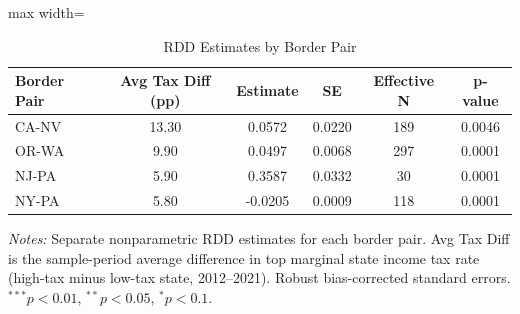 \begin{table}[htbp]
\centering
\caption{RDD Estimates by Border Pair}
\label{tab:pair_het}
\begin{adjustbox}{max width=\textwidth}
\begin{tabular}{lccccc}
  \hline
Border Pair & Avg Tax Diff (pp) & Estimate & SE & Effective N & p-value \\ 
  \hline
CA-NV & 13.30 &  0.0572 & 0.0220 & 189 & 0.0046 \\ 
  OR-WA & 9.90 &  0.0497 & 0.0068 & 297 & 0.0001 \\ 
  NJ-PA & 5.90 &  0.3587 & 0.0332 &  30 & 0.0001 \\ 
  NY-PA & 5.80 & -0.0205 & 0.0009 & 118 & 0.0001 \\ 
   \hline
\end{tabular}
\end{adjustbox}
\begin{tablenotes}\small
\item \textit{Notes:} Separate nonparametric RDD estimates for each border pair. Avg Tax Diff is the sample-period average difference in top marginal state income tax rate (high-tax minus low-tax state, 2012--2021). Robust bias-corrected standard errors. $^{***}p<0.01$, $^{**}p<0.05$, $^{*}p<0.1$.
\end{tablenotes}
\end{table}
